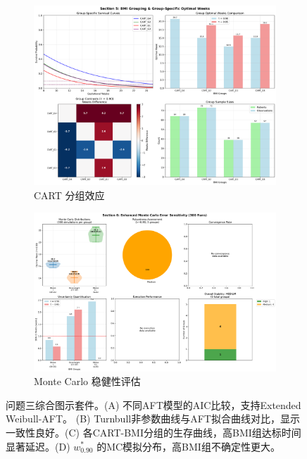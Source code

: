 \documentclass[withoutpreface]{cumcmthesis}
\begin{document}
\begin{figure}[htbp]
\begin{subfigure}{0.48\textwidth}
  \includegraphics[width=\linewidth]{output/figures/p3_section5_group_analysis.png}
  \caption{CART 分组效应}
\end{subfigure}\hfill
\begin{subfigure}{0.48\textwidth}
  \centering
  \includegraphics[width=\linewidth]{output/figures/p3_section6_monte_carlo_analysis.png}
  \caption{Monte Carlo 稳健性评估}
\end{subfigure}
\caption{问题三综合图示套件。(A) 不同AFT模型的AIC比较，支持Extended Weibull-AFT。 (B) Turnbull非参数曲线与AFT拟合曲线对比，显示一致性良好。(C) 各CART-BMI分组的生存曲线，高BMI组达标时间显著延迟。(D) $w^{*}_{0.90}$ 的MC模拟分布，高BMI组不确定性更大。}
\label{fig:p3_suite}
\end{figure}
\end{document}
